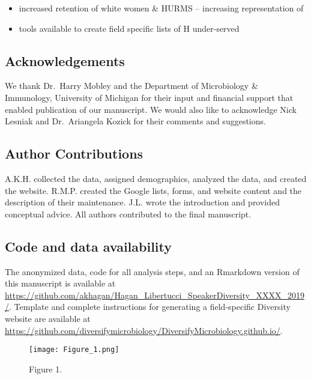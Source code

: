 \documentclass[10pt,]{article}
\providecommand{\tightlist}{%
  \setlength{\itemsep}{0pt}\setlength{\parskip}{0pt}}
\begin{document}
\begin{itemize}
\tightlist
\item
  increased retention of white women \& HURMS -- increasing
  representation of
\item
  tools available to create field specific lists of H under-served
\end{itemize}

\subsection{Acknowledgements}\label{acknowledgements}

We thank Dr.~Harry Mobley and the Department of Microbiology \&
Immunology, University of Michigan for their input and financial support
that enabled publication of our manuscript. We would also like to
acknowledge Nick Lesniak and Dr.~Ariangela Kozick for their comments and
suggestions.

\subsection{Author Contributions}\label{author-contributions}

A.K.H. collected the data, assigned demographics, analyzed the data, and
created the website. R.M.P. created the Google lists, forms, and website
content and the description of their maintenance. J.L. wrote the
introduction and provided conceptual advice. All authors contributed to
the final manuscript.

\subsection{Code and data
availability}\label{code-and-data-availability}

The anonymized data, code for all analysis steps, and an Rmarkdown
version of this manuscript is available at
\url{https://github.com/akhagan/Hagan_Libertucci_SpeakerDiversity_XXXX_2019/}.
Template and complete instructions for generating a field-specific
Diversity website are available at
\url{https://github.com/diversifymicrobiology/DiversifyMicrobiology.github.io/}.

\begin{figure}
\centering
\texttt{[image: Figure\_1.png]}
\caption{Figure 1.}
\end{figure}

\newpage
\end{document}
